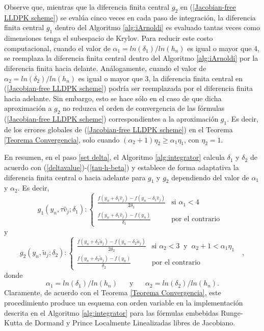 Observe que, mientras que la diferencia finita central $g_2$ en (\ref{Jacobian-free LLDPK scheme}) se evalúa cinco veces en cada paso de integración, la diferencia finita central $g_1$ dentro del Algoritmo \ref{alg:iArnoldi} es evaluado tantas veces como dimensiones tenga el subespacio de Krylov. Para reducir este costo computacional, cuando el valor de $\alpha_1=ln(\delta_1)/ln(h_n)$ es igual o mayor que 4, se reemplaza la diferencia finita central dentro del Algoritmo \ref{alg:iArnoldi} por la diferencia finita hacia delante. Análogamente, cuando el valor de $\alpha_2=ln(\delta_2)/ln(h_n)$ es igual o mayor que 3, la diferencia finita central en (\ref{Jacobian-free LLDPK scheme}) podría ser reemplazada por el diferencia finita hacia adelante. Sin embargo, esto se hace sólo en el caso de que dicha aproximación a $g_2$ no reduzca el orden de convergencia de las fórmulas (\ref{Jacobian-free LLDPK scheme}) correspondientes a la aproximación $g_1$. Es decir, de los errores globales de (\ref{Jacobian-free LLDPK scheme}) en el Teorema \ref{Teorema Convergencia}, solo cuando $(\alpha_2+1)\eta_2 \ge \alpha_1\eta_1$, con $\eta_2=1$.

En resumen, en el paso \ref{set delta}, el Algoritmo \ref{alg:integrator} calcula $\delta_1$ y $\delta_2$ de acuerdo con (\ref{deltavalue})-(\ref{tau-h-beta}) y establece de forma adaptativa la diferencia finita central o hacia adelante para $g_1$ y $g_2$ dependiendo del valor de $\alpha_1$ y $\alpha_2$. Es decir,
\begin{equation} \label{g1}
	g_{1}(y_{n},\tau \widehat{v}_{j};\delta _{1}) : \left\{
	\begin{array}{cc}
	\frac{f(y_{n}+\delta _{1}\widehat{v}_{j})-f(y_{n}-\delta _{1}\widehat{v}_{j})%
	}{2\delta _{1}} & \text{si }\alpha _{1}<4 \\
	\frac{f(y_{n}+\delta _{1}\widehat{v}_{j})-f(y_{n})}{\delta _{1}} & \text{por el contrario}%
	\end{array}
	\text{ }\right.
\end{equation}
y
\begin{equation}  \label{g2}
	g_{2}(y_{n},\widetilde{u}_{j};\delta _{2}) : \left\{
	\begin{array}{cc}
	\frac{f(y_{n}+\delta _{2}\widetilde{u}_{j})-f(y_{n}-\delta _{2}\widetilde{u}%
		_{j})}{2\delta _{2}} & \text{si }\alpha _{2}<3 \;\;\text{y}\;\; \alpha_2+1 < \alpha_1\eta_1 \\
	\frac{f(y_{n}+\delta _{2}\widetilde{u}_{j})-f(y_{n})}{\delta _{2}} &
    \text{por el contrario}%
	\end{array}%
	\text{ }\right. ,
\end{equation}
donde
\begin{equation} \label{alpha_formulas}
    \alpha_1=ln(\delta_1)/ln(h_n) \;\;\;\;\;\; \text{y} \;\;\;\;\;\; \alpha_2=ln(\delta_2)/ln(h_n).
\end{equation}
Claramente, de acuerdo con el Teorema \ref{Teorema Convergencia}, este procedimiento produce un esquema con orden variable en la implementación descrita en el Algoritmo \ref{alg:integrator} para las fórmulas embebidas Runge-Kutta de Dormand y Prince Localmente Linealizadas libres de Jacobiano.

